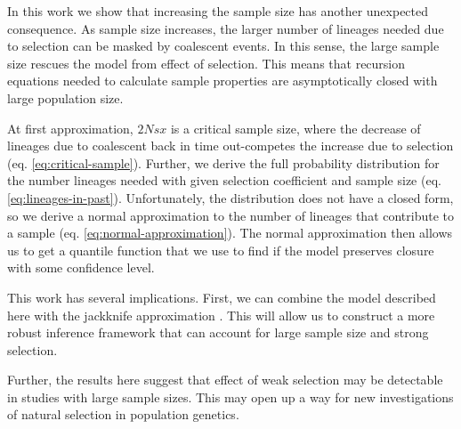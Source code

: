 \documentclass[review]{elsarticle}
\begin{document}
In this work we show that increasing the sample size has another unexpected consequence. As sample
size increases, the larger number of lineages needed due to selection can be masked by coalescent
events. In this sense, the large sample size rescues the model from effect of selection. This means
that recursion equations needed to calculate sample properties are asymptotically closed with large
population size.

At first approximation, $2Nsx$ is a critical sample size, where the decrease of lineages due to
coalescent back in time out-competes the increase due to selection (eq. \eqref{eq:critical-sample}).
Further, we derive the full probability distribution for the number lineages needed with given
selection coefficient and sample size (eq. \eqref{eq:lineages-in-past}). Unfortunately, the
distribution does not have a closed form, so we derive a normal approximation to the number of
lineages that contribute to a sample (eq. \eqref{eq:normal-approximation}). The normal approximation
then allows us to get a quantile function that we use to find if the model preserves closure with
some confidence level.

This work has several implications. First, we can combine the model described here with the
jackknife approximation \citep{JouganousEtAl2017}. This will allow us to construct a more robust
inference framework that can account for large sample size and strong selection.

Further, the results here suggest that effect of weak selection may be detectable in studies with
large sample sizes. This may open up a way for new investigations of natural selection in population
genetics.


\end{document}
